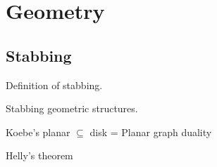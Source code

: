 \section{Geometry}
\label{sec:geom}

\subsection{Stabbing}

Definition of stabbing.

Stabbing geometric structures.\cite{schlipf2013stabbing}

Koebe's planar $\subseteq$ disk
  = Planar graph duality

Helly's theorem
